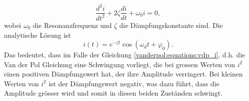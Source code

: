 \begin{equation}
\frac{d^{2}i}{d t^{2}}+ 2\zeta \frac{d i}{d t}+\omega_0i = 0,
\end{equation}
wobei $\omega_0$ die Resonanzfrequenz und $\zeta$ die Dämpfungskonstante sind. Die analytische Lösung ist
\begin{equation}
i(t) = e^{-\zeta t} \cos(\omega_dt+\varphi_0).
\end{equation}
Das bedeutet, dass im Falle der Gleichung \eqref{vanderpol:equations:vdp_i}, d.h. die Van der Pol Gleichung eine Schwingung vorliegt, die bei grossen Werten von $i^2$ einen positiven Dämpfungswert hat, der ihre Amplitude verringert. Bei kleinen Werten von $i^2$ ist der Dämpfungswert negativ, was dazu führt, dass die Amplitude grösser wird und somit in diesen beiden Zuständen schwingt.

